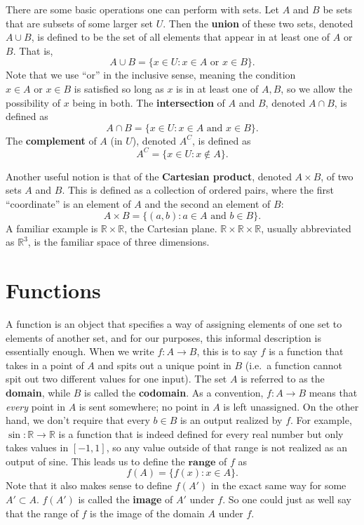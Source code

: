 \documentclass{article}
\begin{document}
There are some basic operations one can perform with sets. Let $A$ and $B$ be sets that are subsets of some larger set $U$. Then the \textbf{union} of these two sets, denoted $A \cup B$,
is defined to be the set of all elements that appear in at least one of $A$ or $B$. That is,
\[ A \cup B = \{x \in U : x \in A \text{ or } x \in B\}. \]
Note that we use ``or'' in the inclusive sense, meaning the condition $x \in A \text{ or } x \in B$ is satisfied so long as $x$ is in at least one of $A,B$, so
we allow the possibility of $x$ being in both.
The \textbf{intersection} of $A$ and $B$, denoted $A \cap B$, is defined as 
\[A \cap B = \{x \in U: x \in A \text{ and } x \in B\}.\]
The \textbf{complement} of $A$ (in $U$), denoted $A^C$, is defined as
\[A^C = \{x \in U: x \notin A\}.\]

Another useful notion is that of the \textbf{Cartesian product}, denoted $A \times B$, of two sets $A$ and $B$. This is defined as a collection of ordered pairs,
where the first ``coordinate'' is an element of $A$ and the second an element of $B$:
\[A \times B = \{(a,b): a \in A \text{ and } b \in B\}.\]
A familiar example is $\mathbb{R} \times \mathbb{R}$, the Cartesian plane. $\mathbb{R} \times \mathbb{R} \times \mathbb{R}$, usually 
abbreviated as $\mathbb{R}^3$, is the familiar space of three dimensions.

\section{Functions}

A function is an object that specifies a way of assigning elements of one set to elements of another set, and for our purposes,
this informal description is essentially enough. When we write $f: A \rightarrow B$, this is to say
$f$ is a function that takes in a point of $A$ and spits out a unique point in $B$ (i.e.\ a function cannot spit out two different values for one input).
The set $A$ is referred to as the \textbf{domain}, while $B$ is called the \textbf{codomain}. As a convention, $f: A \rightarrow B$ means that \emph{every} point in $A$ is sent somewhere; no point in $A$ is left unassigned.
On the other hand, we don't require that every $b \in B$ is an output realized by $f$. For example,
$\sin : \mathbb{R} \rightarrow \mathbb{R}$ is a function that is indeed defined for every real number but only takes values in $[-1,1]$,
so any value outside of that range is not realized as an output of sine. This leads us to define the $\textbf{range}$ of $f$ as 
\[ f(A) = \{f(x): x \in A\}.\]
Note that it also makes sense to define $f(A')$ in the exact same way for some $A' \subset A$. $f(A')$ is called the \textbf{image}
of $A'$ under $f$. So one could just as well say that the range of $f$ is the image of the domain $A$ under $f$.
\end{document}
